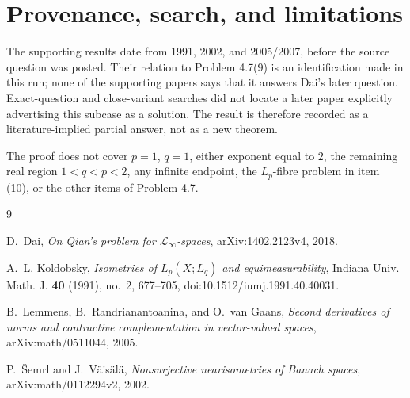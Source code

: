 \documentclass[11pt]{article}
\begin{document}
\section*{Provenance, search, and limitations}

The supporting results date from 1991, 2002, and 2005/2007, before the
source question was posted.  Their relation to Problem 4.7(9) is an
identification made in this run; none of the supporting papers says that it
answers Dai's later question.  Exact-question and close-variant searches did
not locate a later paper explicitly advertising this subcase as a solution.
The result is therefore recorded as a literature-implied partial answer, not
as a new theorem.

The proof does not cover $p=1$, $q=1$, either exponent equal to $2$, the
remaining real region $1<q<p<2$, any infinite endpoint, the $L_p$-fibre
problem in item (10), or the other items of Problem 4.7.

\begin{thebibliography}{9}

D.~Dai,
\emph{On Qian's problem for $\mathcal L_\infty$-spaces},
arXiv:1402.2123v4, 2018.

A.~L. Koldobsky,
\emph{Isometries of $L_p(X;L_q)$ and equimeasurability},
Indiana Univ. Math. J. \textbf{40} (1991), no.~2, 677--705,
doi:10.1512/iumj.1991.40.40031.

B.~Lemmens, B.~Randrianantoanina, and O.~van Gaans,
\emph{Second derivatives of norms and contractive complementation in
vector-valued spaces}, arXiv:math/0511044, 2005.

P.~\v Semrl and J.~V\"ais\"al\"a,
\emph{Nonsurjective nearisometries of Banach spaces},
arXiv:math/0112294v2, 2002.

\end{thebibliography}
\end{document}
